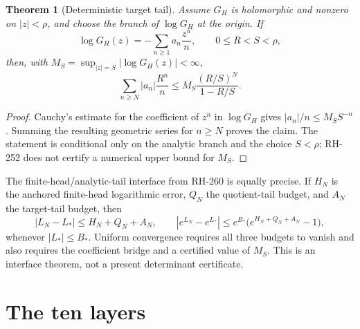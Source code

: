 \documentclass[11pt]{article}
\newtheorem{theorem}{Theorem}
\begin{document}
\begin{theorem}[Deterministic target tail]
Assume $G_H$ is holomorphic and nonzero on $|z|<\rho$, and choose the
branch of $\log G_H$ at the origin.  If
\[
 \log G_H(z)=-\sum_{n\geq 1}a_n\frac{z^n}{n},
 \qquad 0\leq R<S<\rho,
\]
then, with $M_S=\sup_{|z|=S}|\log G_H(z)|<\infty$,
\[
 \sum_{n\geq N}|a_n|\frac{R^n}{n}
 \leq M_S\frac{(R/S)^N}{1-R/S}.
\]
\end{theorem}

\begin{proof}
Cauchy's estimate for the coefficient of $z^n$ in $\log G_H$ gives
$|a_n|/n\leq M_S S^{-n}$.  Summing the resulting geometric series for
$n\geq N$ proves the claim.  The statement is conditional only on the
analytic branch and the choice $S<\rho$; RH-252 does not certify a numerical
upper bound for $M_S$.
\end{proof}

The finite-head/analytic-tail interface from RH-260 is equally precise.  If
$H_N$ is the anchored finite-head logarithmic error, $Q_N$ the quotient-tail
budget, and $A_N$ the target-tail budget, then
\[
 |L_N-L_*|\leq H_N+Q_N+A_N,
 \qquad
 |e^{L_N}-e^{L_*}|
 \leq e^{B_*}\bigl(e^{H_N+Q_N+A_N}-1\bigr),
\]
whenever $|L_*|\leq B_*$.  Uniform convergence requires all three budgets to
vanish and also requires the coefficient bridge and a certified value of
$M_S$.  This is an interface theorem, not a present determinant certificate.

\section{The ten layers}
\end{document}

